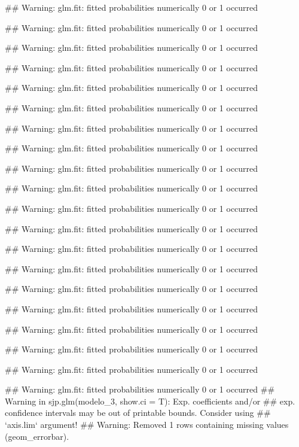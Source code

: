 \documentclass[]{book}
\newenvironment{Shaded}{\begin{snugshade}}{\end{snugshade}}
\newcommand{\NormalTok}[1]{#1}
\begin{document}
\begin{Shaded}
\begin{Highlighting}[]
\NormalTok{## Warning: glm.fit: fitted probabilities numerically 0 or 1 occurred}

\NormalTok{## Warning: glm.fit: fitted probabilities numerically 0 or 1 occurred}

\NormalTok{## Warning: glm.fit: fitted probabilities numerically 0 or 1 occurred}

\NormalTok{## Warning: glm.fit: fitted probabilities numerically 0 or 1 occurred}

\NormalTok{## Warning: glm.fit: fitted probabilities numerically 0 or 1 occurred}

\NormalTok{## Warning: glm.fit: fitted probabilities numerically 0 or 1 occurred}

\NormalTok{## Warning: glm.fit: fitted probabilities numerically 0 or 1 occurred}

\NormalTok{## Warning: glm.fit: fitted probabilities numerically 0 or 1 occurred}

\NormalTok{## Warning: glm.fit: fitted probabilities numerically 0 or 1 occurred}

\NormalTok{## Warning: glm.fit: fitted probabilities numerically 0 or 1 occurred}

\NormalTok{## Warning: glm.fit: fitted probabilities numerically 0 or 1 occurred}

\NormalTok{## Warning: glm.fit: fitted probabilities numerically 0 or 1 occurred}

\NormalTok{## Warning: glm.fit: fitted probabilities numerically 0 or 1 occurred}

\NormalTok{## Warning: glm.fit: fitted probabilities numerically 0 or 1 occurred}

\NormalTok{## Warning: glm.fit: fitted probabilities numerically 0 or 1 occurred}

\NormalTok{## Warning: glm.fit: fitted probabilities numerically 0 or 1 occurred}

\NormalTok{## Warning: glm.fit: fitted probabilities numerically 0 or 1 occurred}

\NormalTok{## Warning: glm.fit: fitted probabilities numerically 0 or 1 occurred}

\NormalTok{## Warning: glm.fit: fitted probabilities numerically 0 or 1 occurred}

\NormalTok{## Warning: glm.fit: fitted probabilities numerically 0 or 1 occurred}
\NormalTok{## Warning in sjp.glm(modelo_3, show.ci = T): Exp. coefficients and/or}
\NormalTok{## exp. confidence intervals may be out of printable bounds. Consider using}
\NormalTok{## `axis.lim` argument!}
\NormalTok{## Warning: Removed 1 rows containing missing values (geom_errorbar).}
\end{Highlighting}
\end{Shaded}
\end{document}

